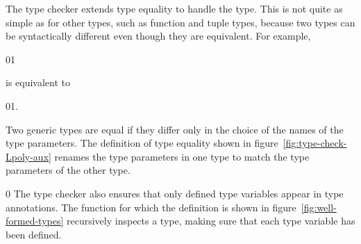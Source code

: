 \documentclass[7x10]{TimesAPriori_MIT}%
\def\racketEd{0}
\def\pythonEd{1}
\providecommand{\BookEdition}{1}
\let\edition\BookEdition
\newcommand{\racket}[1]{{\if\edition\racketEd{#1}\fi}}
\newcommand{\pythonColor}[0]{}
\newcommand{\python}[1]{{\if\edition\pythonEd\pythonColor #1\fi}}
\numberwithin{theorem}{chapter}
\numberwithin{definition}{chapter}
\numberwithin{equation}{chapter}
\begin{document}
The type checker extends type equality to handle the  type.
This is not quite as simple as for other types, such as function and
tuple types, because two  types can be syntactically
different even though they are equivalent. For example,
\begin{center}
\racket{}\python{}
\end{center}
is equivalent to
\begin{center}
\racket{}\python{}.
\end{center}
Two generic types are equal if they differ only in
the choice of the names of the type parameters. The definition of type
equality shown in figure~\ref{fig:type-check-Lpoly-aux} renames the type
parameters in one type to match the type parameters of the other type.

{\if\edition\racketEd
%
The type checker also ensures that only defined type variables appear
in type annotations. The  function for which
the definition is shown in figure~\ref{fig:well-formed-types}
recursively inspects a type, making sure that each type variable has
been defined.
%
\fi}
\end{document}
